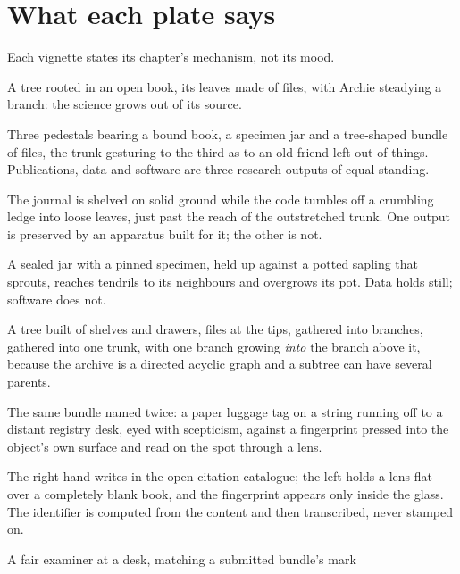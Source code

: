 \section{What each plate says}

Each vignette states its chapter's mechanism, not its mood.

\begin{description}[leftmargin=1.2em,itemsep=2pt,topsep=3pt,font=\normalfont\itshape]
  \item[Frontispiece.] A tree rooted in an open book, its leaves made of files, with Archie
    steadying a branch: the science grows out of its source.
  \item[Front matter.] Three pedestals bearing a bound book, a specimen jar and a tree-shaped
    bundle of files, the trunk gesturing to the third as to an old friend left out of things.
    Publications, data and software are three research outputs of equal standing.
  \item[Chapter~\ref{ch:why}.] The journal is shelved on solid ground while the code tumbles off
    a crumbling ledge into loose leaves, just past the reach of the outstretched trunk. One
    output is preserved by an apparatus built for it; the other is not.
  \item[Chapter~\ref{ch:beyond-fair}.] A sealed jar with a pinned specimen, held up against a
    potted sapling that sprouts, reaches tendrils to its neighbours and overgrows its pot. Data
    holds still; software does not.
  \item[Chapter~\ref{ch:foundations}.] A tree built of shelves and drawers, files at the tips,
    gathered into branches, gathered into one trunk, with one branch growing \emph{into} the
    branch above it, because the archive is a directed acyclic graph and a subtree can have
    several parents.
  \item[Chapter~\ref{ch:identifiers}.] The same bundle named twice: a paper luggage tag on a
    string running off to a distant registry desk, eyed with scepticism, against a fingerprint
    pressed into the object's own surface and read on the spot through a lens.
  \item[Chapter~\ref{ch:ardc}.] The right hand writes in the open citation catalogue; the left
    holds a lens flat over a completely blank book, and the fingerprint appears only inside the
    glass. The identifier is computed from the content and then transcribed, never stamped on.
  \item[Chapter~\ref{ch:repro}.] A fair examiner at a desk, matching a submitted bundle's mark

\end{description}
